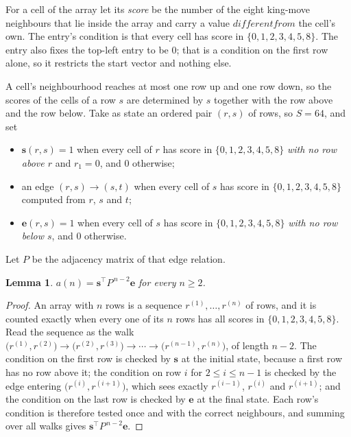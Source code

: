 \documentclass[11pt,a4paper]{article}
\theoremstyle{plain}
\newtheorem{lemma}[theorem]{Lemma}
\theoremstyle{definition}
\begin{document}
For a cell of the array let its \emph{score} be the number of the eight king-move neighbours that lie inside
the array and carry a value $different from$ the cell's own. The entry's condition is that every cell
has score in $\{0,1,2,3,4,5,8\}$. The entry also fixes the top-left entry to be $0$; that is a condition on the first row alone, so it restricts the start vector and nothing else.

A cell's neighbourhood reaches at most one row up and one row down, so the scores of the
cells of a row $s$ are determined by $s$ together with the row above and the row below.
Take as state an ordered pair $(r,s)$ of rows, so $S=64$, and set
\begin{itemize}
\item $\mathbf{s}(r,s)=1$ when every cell of $r$ has score in $\{0,1,2,3,4,5,8\}$ \emph{with no row
above $r$} and $r_1=0$, and $0$ otherwise;
\item an edge $(r,s)\to(s,t)$ when every cell of $s$ has score in $\{0,1,2,3,4,5,8\}$ computed from
$r$, $s$ and $t$;
\item $\mathbf{e}(r,s)=1$ when every cell of $s$ has score in $\{0,1,2,3,4,5,8\}$ \emph{with no row
below $s$}, and $0$ otherwise.
\end{itemize}
Let $P$ be the adjacency matrix of that edge relation.

\begin{lemma}\label{lem:walk}
$a(n)=\mathbf{s}^{\!\top}P^{\,n-2}\mathbf{e}$ for every $n\ge2$.
\end{lemma}

\begin{proof}
An array with $n$ rows is a sequence $r^{(1)},\dots,r^{(n)}$ of rows, and it is counted
exactly when every one of its $n$ rows has all scores in $\{0,1,2,3,4,5,8\}$. Read the sequence as the
walk $\bigl(r^{(1)},r^{(2)}\bigr)\to\bigl(r^{(2)},r^{(3)}\bigr)\to\cdots\to
\bigl(r^{(n-1)},r^{(n)}\bigr)$, of length $n-2$. The condition on the first row is
checked by $\mathbf{s}$ at the initial state, because a first row has no row above it; the
condition on row $i$ for $2\le i\le n-1$ is checked by the edge entering
$\bigl(r^{(i)},r^{(i+1)}\bigr)$, which sees exactly $r^{(i-1)}$, $r^{(i)}$ and
$r^{(i+1)}$; and the condition on the last row is checked by $\mathbf{e}$ at the final
state. Each row's condition is therefore tested once and with the correct neighbours, and
summing over all walks gives $\mathbf{s}^{\!\top}P^{\,n-2}\mathbf{e}$.
\end{proof}
\end{document}

